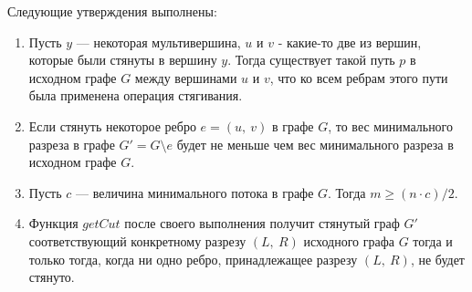\documentclass[a4paper,12pt]{article}
\begin{document}
 \begin{fulllemma}
 Следующие утверждения выполнены:
 \begin{enumerate}
     \item Пусть $y$ — некоторая мультивершина, $u$ и $v$ - какие-то две из вершин, которые были стянуты в вершину $y$. Тогда существует такой путь $p$ в исходном графе $G$ между вершинами $u$ и $v$, что ко всем ребрам этого пути была применена операция стягивания.
     \item Если стянуть некоторое ребро $e = (u,\ v)$ в графе $G$, то вес минимального разреза в графе $G' = G\setminus e$ будет не меньше чем вес минимального разреза в исходном графе $G$.
     \item Пусть $c$ — величина минимального потока в графе $G$. Тогда $m \geqslant (n\cdot c)/2$.
     \item Функция $getCut$ после своего выполнения получит стянутый граф $G'$ соответствующий конкретному разрезу $(L,\ R)$ исходного графа $G$ тогда и только тогда, когда ни одно ребро, принадлежащее разрезу $(L,\ R)$, не будет стянуто.
 \end{enumerate}
 \end{fulllemma}
\end{document}
